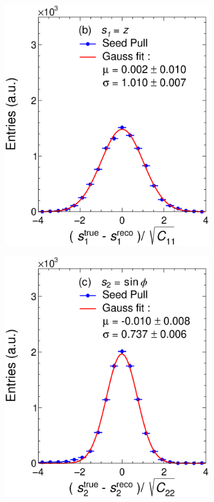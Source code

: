 \begin{figure}[t]
\begin{subfigure}{0.32\textwidth}
         \includegraphics[width=\textwidth]{figures/ch4-KF_NDGArLite/MC/ALICE+KF/UnitSeed_p1.eps}
         \caption{}
         \label{fig:resp1Seed_GArLite_ALICE+KF}
     \end{subfigure}
    \begin{subfigure}{0.32\textwidth}
         \centering
         \includegraphics[width=\textwidth]{figures/ch4-KF_NDGArLite/MC/ALICE+KF/UnitSeed_p2.eps}

\end{subfigure}
\end{figure}

